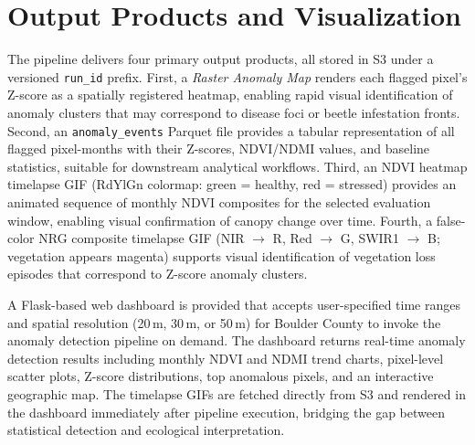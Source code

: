 \section{Output Products and Visualization}

The pipeline delivers four primary output products, all stored in S3 under a versioned \texttt{run\_id} prefix. First, a \textit{Raster Anomaly Map} renders each flagged pixel's Z-score as a spatially registered heatmap, enabling rapid visual identification of anomaly clusters that may correspond to disease foci or beetle infestation fronts. Second, an \texttt{anomaly\_events} Parquet file provides a tabular representation of all flagged pixel-months with their Z-scores, NDVI/NDMI values, and baseline statistics, suitable for downstream analytical workflows. Third, an NDVI heatmap timelapse GIF (RdYlGn colormap: green = healthy, red = stressed) provides an animated sequence of monthly NDVI composites for the selected evaluation window, enabling visual confirmation of canopy change over time. Fourth, a false-color NRG composite timelapse GIF (NIR $\rightarrow$ R, Red $\rightarrow$ G, SWIR1 $\rightarrow$ B; vegetation appears magenta) supports visual identification of vegetation loss episodes that correspond to Z-score anomaly clusters.

A Flask-based web dashboard is provided that accepts user-specified time ranges and spatial resolution (20\,m, 30\,m, or 50\,m) for Boulder County to invoke the anomaly detection pipeline on demand. The dashboard returns real-time anomaly detection results including monthly NDVI and NDMI trend charts, pixel-level scatter plots, Z-score distributions, top anomalous pixels, and an interactive geographic map. The timelapse GIFs are fetched directly from S3 and rendered in the dashboard immediately after pipeline execution, bridging the gap between statistical detection and ecological interpretation.